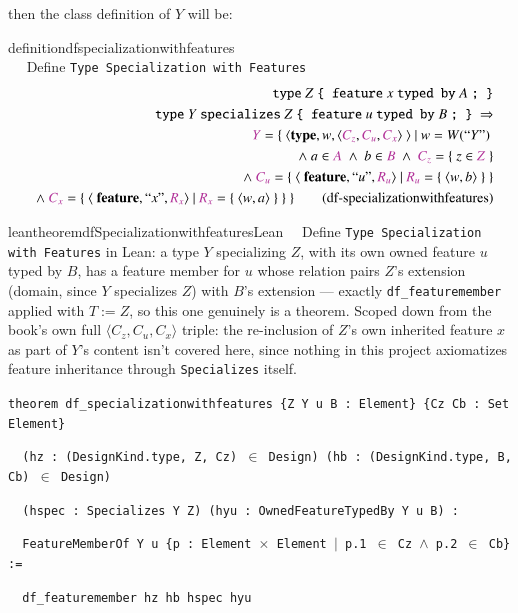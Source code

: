 then the class definition of $Y$ will be:
\begin{restatable}{definition}{dfspecializationwithfeatures}~~  \\ ~~ Define \texttt{Type Specialization with Features}
\begin{align}
\texttt{type}~ Z ~\texttt{\{ feature}~ x~\texttt{typed by}~A~\texttt{; \}} \notag \\ %
\texttt{type}~ Y ~\texttt{specializes}~Z~\texttt{\{ feature}~ u~\texttt{typed by}~B~\texttt{; \}} ~\Rightarrow  \notag \\
\mc{Y}=\{~\langle \textbf{type},w,\langle \mc{C_z},\mc{C_u},\mc{C_x}\rangle~\rangle~\vert~w=W(``Y")~\notag \\
\wedge ~a \in \mc{A} ~\wedge~ b \in \mc{B}
~\wedge~\mc{C_z}=\{~z\in \mc{Z}~\} \notag \\
~\wedge~ \mc{C_u}=\{~\langle~\textbf{feature}, ``u",\mc{R_u} \rangle~\vert ~\mc{R_u}=\{~\langle w,b\rangle~\}~\} \notag \\
~~~\wedge~\mc{C_x}=\{~\langle~\textbf{feature}, ``x",\mc{R_x} \rangle~\vert ~\mc{R_x}=\{~\langle w,a\rangle~\}~\} ~\}
\label{eq:df-specializationwithfeatures}\tag{df-specializationwithfeatures}
\end{align}
\end{restatable}

\begin{restatable}{leantheorem}{dfSpecializationwithfeaturesLean}~~
Define \texttt{Type Specialization with Features} in Lean: a type $Y$ specializing $Z$, with its own owned
feature $u$ typed by $B$, has a feature member for $u$ whose relation pairs $Z$'s extension (domain, since
$Y$ specializes $Z$) with $B$'s extension --- exactly \texttt{df\_featuremember} applied with $T:=Z$, so this
one genuinely is a theorem. Scoped down from the book's own full $\langle C_z,C_u,C_x\rangle$ triple: the
re-inclusion of $Z$'s own inherited feature $x$ as part of $Y$'s content isn't covered here, since nothing in
this project axiomatizes feature inheritance through \texttt{Specializes} itself.

\texttt{\textcolor{leancolor}{theorem} \textcolor{leanyellow}{df\_specializationwithfeatures} \{Z Y u B : Element\} \{Cz Cb : Set Element\}}

\texttt{~~(hz : (DesignKind.type, Z, Cz) $\in$ Design) (hb : (DesignKind.type, B, Cb) $\in$ Design)}

\texttt{~~(hspec : Specializes Y Z) (hyu : OwnedFeatureTypedBy Y u B) :}

\texttt{~~FeatureMemberOf Y u \{p : Element $\times$ Element $\vert$ p.1 $\in$ Cz $\wedge$ p.2 $\in$ Cb\} :=}

\texttt{~~df\_featuremember hz hb hspec hyu}
\label{df_specializationwithfeatures}
\end{restatable}

